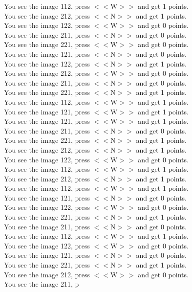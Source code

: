 \documentclass[pdflatex,sn-nature]{sn-jnl}%
\theoremstyle{thmstyleone}%
\theoremstyle{thmstyletwo}%
\theoremstyle{thmstylethree}%
\begin{document}
You see the image 112, press $<<$W$>>$ and get 1 points. $~$\\ 
You see the image 212, press $<<$N$>>$ and get 1 points. $~$\\ 
You see the image 122, press $<<$W$>>$ and get 0 points. $~$\\ 
You see the image 211, press $<<$N$>>$ and get 0 points. $~$\\ 
You see the image 221, press $<<$W$>>$ and get 0 points. $~$\\ 
You see the image 121, press $<<$N$>>$ and get 0 points. $~$\\ 
You see the image 122, press $<<$N$>>$ and get 1 points. $~$\\ 
You see the image 212, press $<<$W$>>$ and get 0 points. $~$\\ 
You see the image 211, press $<<$N$>>$ and get 0 points. $~$\\ 
You see the image 221, press $<<$N$>>$ and get 1 points. $~$\\ 
You see the image 112, press $<<$W$>>$ and get 1 points. $~$\\ 
You see the image 121, press $<<$W$>>$ and get 1 points. $~$\\ 
You see the image 121, press $<<$W$>>$ and get 1 points. $~$\\ 
You see the image 211, press $<<$N$>>$ and get 0 points. $~$\\ 
You see the image 221, press $<<$N$>>$ and get 1 points. $~$\\ 
You see the image 212, press $<<$N$>>$ and get 1 points. $~$\\ 
You see the image 122, press $<<$W$>>$ and get 0 points. $~$\\ 
You see the image 112, press $<<$W$>>$ and get 1 points. $~$\\ 
You see the image 212, press $<<$N$>>$ and get 1 points. $~$\\ 
You see the image 112, press $<<$W$>>$ and get 1 points. $~$\\ 
You see the image 121, press $<<$N$>>$ and get 0 points. $~$\\ 
You see the image 122, press $<<$W$>>$ and get 0 points. $~$\\ 
You see the image 221, press $<<$N$>>$ and get 1 points. $~$\\ 
You see the image 211, press $<<$N$>>$ and get 0 points. $~$\\ 
You see the image 112, press $<<$W$>>$ and get 1 points. $~$\\ 
You see the image 122, press $<<$W$>>$ and get 0 points. $~$\\ 
You see the image 121, press $<<$N$>>$ and get 0 points. $~$\\ 
You see the image 221, press $<<$N$>>$ and get 1 points. $~$\\ 
You see the image 212, press $<<$W$>>$ and get 0 points. $~$\\ 
You see the image 211, p 
\end{document}
